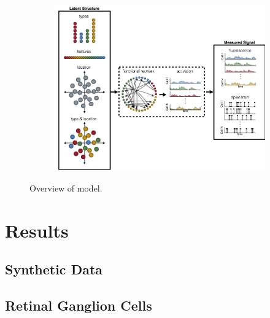 \begin{figure}[t]
  \centering
  \begin{subfigure}[b]{\textwidth}
    \centering
    \includegraphics[width=\textwidth]{figures/ch3/figure1.png}
  \end{subfigure}
  \caption{Overview of model.}
  \label{fig:fig1}
\end{figure}

\section{Results}

\subsection{Synthetic Data}

\subsection{Retinal Ganglion Cells}

